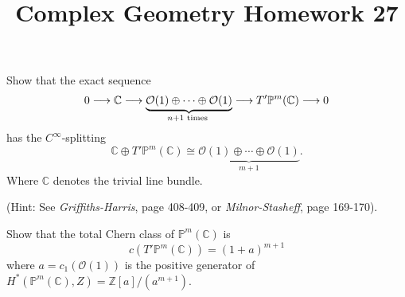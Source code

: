 \documentclass[12pt]{article}
\title{Complex Geometry Homework 27}
\author{}
\date{}
\begin{document}
\maketitle
\begin{problem}
  Show that the exact sequence \[
    0\longrightarrow \mathbb{C}\longrightarrow\underbrace{\mathcal{O}(1)\oplus\cdots\oplus\mathcal{O}(1)}_{
    n+1\text{ times }} \longrightarrow T'\mathbb{P}^m(\mathbb{C})\longrightarrow 0
  \] has the \(C^\infty\)-splitting \[
    \mathbb{C}\oplus T'\mathbb{P}^m(\mathbb{C})\cong 
    \underbrace{\mathcal{O}(1)\oplus\cdots\oplus\mathcal{O}(1)}_{m+1}
  .\] Where \(\mathbb{C}\) denotes the trivial line bundle.

  (Hint: See \emph{Griffiths-Harris}, page 408-409, or \emph{Milnor-Stasheff}, page
  169-170).
\end{problem}
\begin{problem}
  Show that the total Chern class of \(\mathbb{P}^m(\mathbb{C})\) is \[
    c(T'\mathbb{P}^m(\mathbb{C}))=(1+a)^{m+1}
  \] where \(a=c_1(\mathcal{O}(1))\) is the positive generator of 
  \(H^*(\mathbb{P}^m(\mathbb{C}),Z)=\mathbb{Z}[a]/(a^{m+1})\).
\end{problem}
\end{document}
